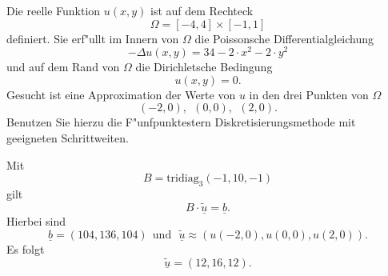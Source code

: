 Die reelle Funktion $u(x,y)$ ist auf dem Rechteck 
\[
\Omega = [-4, 4] \times [-1,1]
\]
definiert. Sie erf"ullt im Innern von $\Omega$ die
Poissonsche Differentialgleichung 
\[
- \Delta u(x,y) = 34 - 2 \cdot x^2 - 2 \cdot y^2
\]
und auf dem Rand von $\Omega$ die Dirichletsche Bedingung 
\[
u(x,y) = 0.
\]
Gesucht ist eine Approximation der Werte von $u$ in den drei Punkten
von $\Omega$ 
\[
(-2,0), \ \  (0,0), \ \ (2,0).
\]
Benutzen Sie hierzu die F"unfpunktestern Diskretisierungsmethode mit
geeigneten Schrittweiten. 
 
\begin{loesung}
Mit 
\[
B = \mbox{tridiag}_3(-1,10,-1)
\]
gilt 
\[
B \cdot \underline{\tilde u} = \underline{b}.
\]
Hierbei sind 
\[
\underline{b} = (104, 136, 104) \ \ \mbox{und} \ \ \ \underline{\tilde u} \approx
(u(-2,0), u(0,0), u(2,0)).
\]
Es folgt 
\[
\underline{\tilde u} = (12, 16, 12).
\]
\end{loesung}

